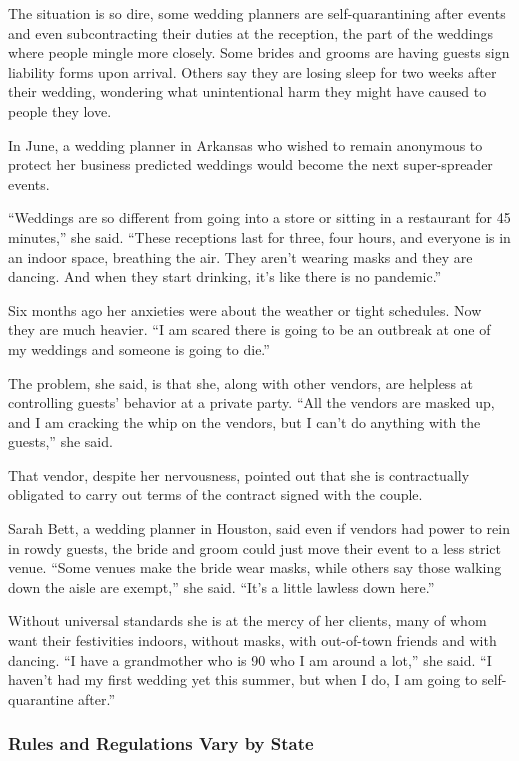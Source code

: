 The situation is so dire, some wedding planners are self-quarantining
after events and even subcontracting their duties at the reception, the
part of the weddings where people mingle more closely. Some brides and
grooms are having guests sign liability forms upon arrival. Others say
they are losing sleep for two weeks after their wedding, wondering what
unintentional harm they might have caused to people they love.

In June, a wedding planner in Arkansas who wished to remain anonymous to
protect her business predicted weddings would become the next
super-spreader events.

``Weddings are so different from going into a store or sitting in a
restaurant for 45 minutes,'' she said. ``These receptions last for
three, four hours, and everyone is in an indoor space, breathing the
air. They aren't wearing masks and they are dancing. And when they start
drinking, it's like there is no pandemic.''

Six months ago her anxieties were about the weather or tight schedules.
Now they are much heavier. ``I am scared there is going to be an
outbreak at one of my weddings and someone is going to die.''

The problem, she said, is that she, along with other vendors, are
helpless at controlling guests' behavior at a private party. ``All the
vendors are masked up, and I am cracking the whip on the vendors, but I
can't do anything with the guests,'' she said.

That vendor, despite her nervousness, pointed out that she is
contractually obligated to carry out terms of the contract signed with
the couple.

Sarah Bett, a wedding planner in Houston, said even if vendors had power
to rein in rowdy guests, the bride and groom could just move their event
to a less strict venue. ``Some venues make the bride wear masks, while
others say those walking down the aisle are exempt,'' she said. ``It's a
little lawless down here.''

Without universal standards she is at the mercy of her clients, many of
whom want their festivities indoors, without masks, with out-of-town
friends and with dancing. ``I have a grandmother who is 90 who I am
around a lot,'' she said. ``I haven't had my first wedding yet this
summer, but when I do, I am going to self-quarantine after.''

\hypertarget{rules-and-regulations-vary-by-state}{%
\subsubsection{\texorpdfstring{\textbf{Rules and Regulations Vary by
State}}{Rules and Regulations Vary by State}}\label{rules-and-regulations-vary-by-state}}

